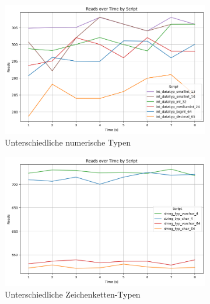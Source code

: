 \vspace{-12pt}
\begin{figure}[H]
    \centering
    \begin{subfigure}[t]{0.48\textwidth}
        \centering
        \includegraphics[width=\textwidth]{PNGs/Script/Data_Types/Smaller/number-type/Reads}
        \caption{Unterschiedliche numerische Typen}
        \label{data-types-smaller-number-type-reads}
    \end{subfigure}
    \hfill
    \begin{subfigure}[t]{0.48\textwidth}
        \centering
        \includegraphics[width=\textwidth]{PNGs/Script/Data_Types/Smaller/string-type/Reads}
        \caption{Unterschiedliche Zeichenketten-Typen}
        \label{fig:data-types-smaller-string-type-reads}
    \end{subfigure}
    \newline
    \begin{subfigure}[t]{0.48\textwidth}

\end{subfigure}
\end{figure}
